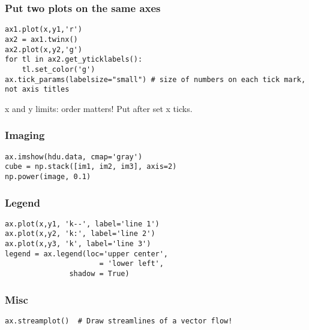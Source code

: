 \documentclass{article}
\begin{document}
\begin{multicols}{2}
\subsubsection{Put two plots on the same axes}
\begin{lstlisting}
ax1.plot(x,y1,'r')
ax2 = ax1.twinx()
ax2.plot(x,y2,'g')
for tl in ax2.get_yticklabels():
    tl.set_color('g')
ax.tick_params(labelsize="small") # size of numbers on each tick mark, not axis titles
\end{lstlisting}
x and y limits: order matters! Put after set x ticks.

\subsubsection{Imaging}
\begin{lstlisting}
ax.imshow(hdu.data, cmap='gray')
cube = np.stack([im1, im2, im3], axis=2)
np.power(image, 0.1)
\end{lstlisting}

\subsubsection{Legend}
\begin{lstlisting}
ax.plot(x,y1, 'k--', label='line 1')
ax.plot(x,y2, 'k:', label='line 2')
ax.plot(x,y3, 'k', label='line 3')
legend = ax.legend(loc='upper center',
                      = 'lower left',
               shadow = True)
\end{lstlisting}

\subsubsection{Misc}
\begin{lstlisting}
ax.streamplot()  # Draw streamlines of a vector flow!
\end{lstlisting}
\end{multicols}

\end{document}
